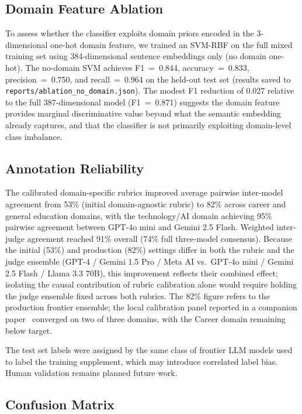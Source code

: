 \documentclass[11pt,a4paper]{article}
\begin{document}
\subsection{Domain Feature Ablation}

To assess whether the classifier exploits domain priors encoded in the 3-dimensional one-hot
domain feature, we trained an SVM-RBF on the full mixed training set using 384-dimensional
sentence embeddings only (no domain one-hot). The no-domain SVM achieves F1~=~0.844,
accuracy~=~0.833, precision~=~0.750, and recall~=~0.964 on the held-out test set (results
saved to \texttt{reports/ablation\_no\_domain.json}). The modest F1 reduction of 0.027 relative
to the full 387-dimensional model (F1~=~0.871) suggests the domain feature provides marginal
discriminative value beyond what the semantic embedding already captures, and that the
classifier is not primarily exploiting domain-level class imbalance.

\subsection{Annotation Reliability}

The calibrated domain-specific rubrics improved average pairwise inter-model agreement from
53\% (initial domain-agnostic rubric) to 82\% across career and general education domains,
with the technology/AI domain achieving 95\% pairwise agreement between GPT-4o mini and Gemini
2.5 Flash. Weighted inter-judge agreement reached 91\% overall (74\% full three-model
consensus). Because the initial (53\%) and production (82\%) settings differ in both the rubric and the
judge ensemble (GPT-4 / Gemini 1.5 Pro / Meta AI vs.\ GPT-4o mini / Gemini 2.5 Flash /
Llama 3.3 70B), this improvement reflects their combined effect; isolating the causal
contribution of rubric calibration alone would require holding the judge ensemble fixed across
both rubrics. The 82\% figure refers to the production frontier ensemble; the local calibration
panel reported in a companion paper~\cite{crucible} converged on two of three domains, with the Career domain
remaining below target.

The test set labels were assigned by the same class of frontier LLM models used to label the
training supplement, which may introduce correlated label bias. Human validation remains planned
future work.

\subsection{Confusion Matrix}
\end{document}
